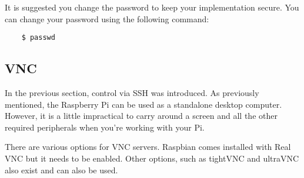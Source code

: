 It is suggested you change the password to keep your implementation secure. You can change your password using the following command:
\begin{verbatim}
    $ passwd
\end{verbatim}

\subsection{VNC}
\label{app:Services-VNC}
In the previous section, control via SSH was introduced. As previously mentioned, the Raspberry Pi can be used as a standalone desktop computer. However, it is a little impractical to carry around a screen and all the other required peripherals when you're working with your Pi. 

There are various options for VNC servers. Raspbian comes installed with Real VNC but it needs to be enabled. Other options, such as tightVNC and ultraVNC also exist and can also be used. 

